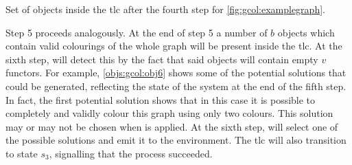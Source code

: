 \begin{cpobjectsfloat}
\begin{cpobjects}
    
    
    
    
    \cpobjectsline{\vdots}
    
    
    
\end{cpobjects}
\caption[Example set of objects after the fourth step for  \gls{cps} solution]{\label{objs:gcol:obj4}Set of objects inside the \gls{tlc} after the fourth step for \cref{fig:gcol:examplegraph}.}
\end{cpobjectsfloat}

Step 5 proceeds analogously.  At the end of step 5 a number of \(b\) objects which contain valid colourings of the whole graph will be present inside the \gls{tlc}.  At the sixth step,  will detect this by the fact that said objects will contain empty \(v\) functors.  For example, \cref{objs:gcol:obj6} shows some of the potential solutions that could be generated, reflecting the state of the system at the end of the fifth step.  In fact, the first potential solution shows that in this case it is possible to completely and validly colour this graph using only two colours.  This solution may or may not be chosen when  is applied.  At the sixth step,  will select one of the possible solutions and emit it to the environment.  The \gls{tlc} will also transition to state \(s_3\), signalling that the process succeeded.

